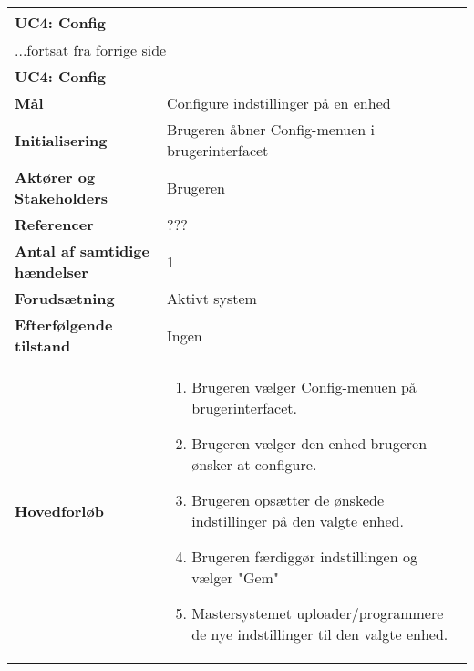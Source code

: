 \begin{center} \centering
	\begin{longtable}{|p{6cm}|p{8cm}|}  %
	\hline
		\multicolumn{2}{|l|}{\textbf{UC4: Config}} \\\hline %
		\endfirsthead
		
		\multicolumn{2}{l}{...fortsat fra forrige side} \\ \hline %
		\multicolumn{2}{|l|}{\textbf{UC4: Config}} \\\hline %
		\endhead	
		
		\textbf{Mål}								& Configure indstillinger på en enhed			\\\hline
		\textbf{Initialisering}					& Brugeren åbner Config-menuen i brugerinterfacet			\\\hline
		\textbf{Aktører og Stakeholders}			& Brugeren			\\\hline
		\textbf{Referencer}						& ???			\\\hline
		\textbf{Antal af samtidige hændelser}	& 1			\\\hline
		\textbf{Forudsætning}					& Aktivt system			\\\hline
		\textbf{Efterfølgende tilstand}			& Ingen			\\\hline
		\textbf{Hovedforløb}					
			&\begin{enumerate}
	
				\item Brugeren vælger Config-menuen på brugerinterfacet.
				
				\item Brugeren vælger den enhed brugeren ønsker at configure.
				
				\item Brugeren opsætter de ønskede indstillinger på den valgte enhed.
				
				\item Brugeren færdiggør indstillingen og vælger "Gem"
				
				\item Mastersystemet uploader/programmere de nye indstillinger til den valgte enhed. 
	
			\end{enumerate}\\\hline
	\end{longtable}
	\label{UC4} 
\end{center}


